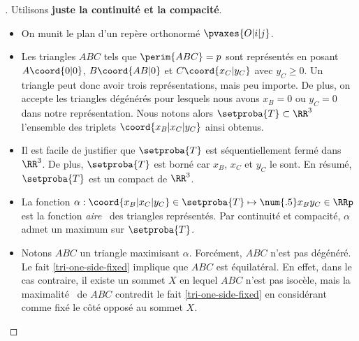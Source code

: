 

\begin{proof}[] \label{tri-topo-comp}
	Utilisons \textbf{juste la continuité et la compacité}.%
	\begin{itemize}
		\item On munit le plan d'un repère orthonormé $\pvaxes{O | i | j}$. 

		\item Les triangles $ABC$ tels que $\perim{ABC} = p$ sont représentés en posant $A\coord{0 | 0}$, $B\coord{AB | 0}$ et $C\coord{x_C | y_C}$ avec $y_C \geq 0$. Un triangle peut donc avoir trois représentations, mais peu importe.
		De plus, on accepte les triangles dégénérés pour lesquels nous avons $x_B = 0$ ou $y_C = 0$ dans notre représentation.
		Nous notons alors $\setproba{T} \subset \RR^3$ l'ensemble des triplets $\coord{x_B | x_C | y_C}$ ainsi obtenus.

		\item Il est facile de justifier que $\setproba{T}$ est séquentiellement fermé dans $\RR^3$.
		De plus, $\setproba{T}$ est borné car $x_B$, $x_C$ et $y_C$ le sont.
		En résumé, $\setproba{T}$ est un compact de $\RR^3$.

		\item La fonction $\alpha: \coord{x_B | x_C | y_C} \in \setproba{T} \mapsto \num{.5} x_B y_C \in \RRp$ est la fonction \og \emph{aire} \fg\ des triangles représentés.
		Par continuité et compacité, $\alpha$ admet un maximum sur $\setproba{T}$. 
		

		\item Notons $ABC$ un triangle maximisant $\alpha$.
		Forcément, $ABC$ n'est pas dégénéré. 
		Le fait \ref{tri-one-side-fixed} implique que $ABC$ est équilatéral. 
		En effet,
		dans le cas contraire, il existe un sommet $X$ en lequel $ABC$ n'est pas isocèle, mais la \og maximalité \fg\ de $ABC$ contredit le fait \ref{tri-one-side-fixed} en considérant comme fixé le côté opposé au sommet $X$.
	\end{itemize}
	
	\null\vspace{-6ex}
\end{proof}





